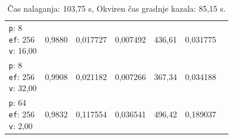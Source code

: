 \begin{table}[htbp]
\begin{tabularx}{\textwidth}{Xrrrrrr}
    \makecell{\texttt{p}: 8\\\texttt{ef}: 256\\\texttt{v}: 16,00} & 0,9880 & 0,017727 & 0,007492 & 436,61 & 0,031775 \\
    \makecell{\texttt{p}: 8\\\texttt{ef}: 256\\\texttt{v}: 32,00} & 0,9908 & 0,021182 & 0,007266 & 367,34 & 0,034188 \\
    \makecell{\texttt{p}: 64\\\texttt{ef}: 256\\\texttt{v}: 2,00} & 0,9832 & 0,117554 & 0,036541 & 496,42 & 0,189037 \\
    \bottomrule
  \end{tabularx}
\caption* {Čas nalaganja: 103,75 s, Okviren čas gradnje kazala: 85,15 s.}\end{table}

